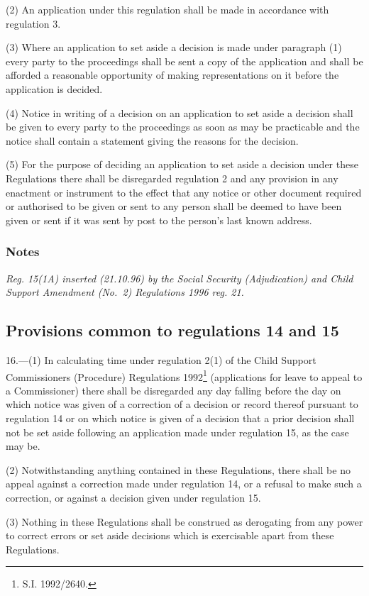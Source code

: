 \documentclass[a4paper]{article}
\newcommand\amendment[1]{\subsubsection*{Notes}{\itshape\frenchspacing\footnotesize #1 \par}}
\begin{document}
(2) An application under this regulation shall be made in accordance with regulation 3.

(3) Where an application to set aside a decision is made under paragraph (1) every party to the proceedings shall be sent a copy of the application and shall be afforded a reasonable opportunity of making representations on it before the application is decided.

(4) Notice in writing of a decision on an application to set aside a decision shall be given to every party to the proceedings as soon as may be practicable and the notice shall contain a statement giving the reasons for the decision.

(5) For the purpose of deciding an application to set aside a decision under these Regulations there shall be disregarded regulation 2 and any provision in any enactment or instrument to the effect that any notice or other document required or authorised to be given or sent to any person shall be deemed to have been given or sent if it was sent by post to the person’s last known address.

\amendment{
Reg. 15(1A) inserted (21.10.96) by the Social Security (Adjudication) and Child Support Amendment (No.\ 2) Regulations 1996 reg. 21.
}

\subsection[16. Provisions common to regulations 14 and 15]{Provisions common to regulations 14 and 15}

16.—(1) In calculating time under regulation 2(1) of the Child Support Commissioners (Procedure) Regulations 1992\footnote{\frenchspacing S.I. 1992/2640.} (applications for leave to appeal to a Commissioner) there shall be disregarded any day falling before the day on which notice was given of a correction of a decision or record thereof pursuant to regulation 14 or on which notice is given of a decision that a prior decision shall not be set aside following an application made under regulation 15, as the case may be.

(2) Notwithstanding anything contained in these Regulations, there shall be no appeal against a correction made under regulation 14, or a refusal to make such a correction, or against a decision given under regulation 15.

(3) Nothing in these Regulations shall be construed as derogating from any power to correct errors or set aside decisions which is exercisable apart from these Regulations.
\end{document}

